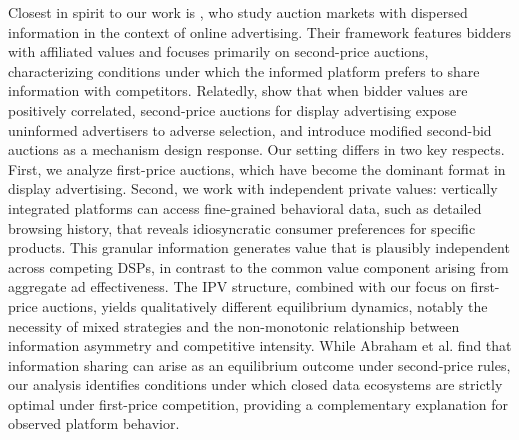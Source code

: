\noindent Closest in spirit to our work is \textcite{abrahamPeachesLemonsCookies2020}, who study auction markets with dispersed information in the context of online advertising. Their framework features bidders with affiliated values and focuses primarily on second-price auctions, characterizing conditions under which the informed platform prefers to share information with competitors. Relatedly, \textcite{arnostiAdverseSelectionAuction2016} show that when bidder values are positively correlated, second-price auctions for display advertising expose uninformed advertisers to adverse selection, and introduce modified second-bid auctions as a mechanism design response. Our setting differs in two key respects. First, we analyze first-price auctions, which have become the dominant format in display advertising. Second, we work with independent private values: vertically integrated platforms can access fine-grained behavioral data, such as detailed browsing history, that reveals idiosyncratic consumer preferences for specific products. This granular information generates value that is plausibly independent across competing DSPs, in contrast to the common value component arising from aggregate ad effectiveness. The IPV structure, combined with our focus on first-price auctions, yields qualitatively different equilibrium dynamics, notably the necessity of mixed strategies and the non-monotonic relationship between information asymmetry and competitive intensity. While Abraham et al. find that information sharing can arise as an equilibrium outcome under second-price rules, our analysis identifies conditions under which closed data ecosystems are strictly optimal under first-price competition, providing a complementary explanation for observed platform behavior.\par

